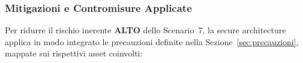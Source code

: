\documentclass[11pt,a4paper]{article}
\begin{document}
%

\subsubsection{Mitigazioni e Contromisure Applicate}

Per ridurre il rischio inerente \textbf{ALTO} dello Scenario~7, la secure architecture applica in modo integrato le precauzioni definite nella Sezione~\ref{sec:precauzioni}, mappate sui rispettivi asset coinvolti:
\end{document}
